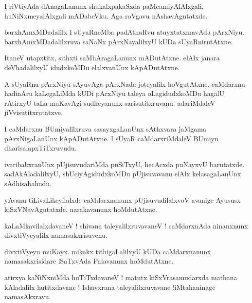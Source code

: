 \documentclass{article}
\begin{document}
\begin{mng}%
I riVtiyAda dAnagaLanunx shukalxpakaSxda paMcamiyAlAlxgali, huNiNxmeyalAlxgali mADabeVku. Aga 
roVgavu nAshavAgutatxde.
\end{mng}

\begin{mng}%
barxhAmxMDadalilx I sUyaRneMba padAthaRvu atuyxtatxmavAda pArxNiyu. barxhAmxMDadalilxruva saNaNx 
pArxNayalilxyU kUDa sUyaRnirutAtxne.
\end{mng}

\begin{mng}%
ItaneV utapxtitx, sithxti saMhAragaLanunx mADutAtxne. elAlx janara deVhadalilxyU idudxkoMDu 
elalxvanUnx kApADutAtxne.
\end{mng}

\begin{mng}%
A sUyaRnu pArxNiyu sAyuvAga pArxNada joteyalilx hoVgutAtxne. caMdarxnu hadinAru kaLegaLiMda kUDi 
pArxNiyu taleya oLagidudxkoMDu hagalU rAtirxyU taLa muKavAgi sudheyanunx sarisutitxruvanu. 
adariMdaleV jiVvisutitxrutatxve.
\end{mng}

\begin{mng}%
I caMdarxnu BUmiyalilxruva sasayxgaLanUnx sAthxvara jaMgama pArxNigaLanUnx kApADutAtxne. I sUyaR 
caMdarxriMdaleV BUmiyu dharisalapxTiTxruvudu.
\end{mng}

\begin{mng}%
ivaribabxranUnx pUjisuvudariMda puSiTxyU, hecAcxda puNayxvU barutatxde. sadAkAladalilxyU, 
shUciyAgidudxkoMDu pUjisuvavanu elAlx kelasagaLanUnx sAdhisabahudu.
\end{mng}

\begin{mng}%
yAvanu tiLivaLikeyilalxde caMdarxnanunx pUjisuvudilalxvoV avanige Ayususx kiSxVNavAgutatxde. 
narakavanunx hoMdutAtxne.
\end{mng}

\begin{mng}%
kaLaMkavilalxdavaneV ! shivana taleyalilxruvavaneV ! caMdarxnAda ninanxnunx divxtiVyeyalilx 
namasakxrisuvenu.
\end{mng}

\begin{mng}%
divxtiVyeyu muKayx. mikakx tithigaLalilxyU kUDa caMdarxnanunx namasakxrisidare iSaTxvAda 
Palavanunx hoMdutAtxne.
\end{mng}

\begin{mng}%
atirxya kaNiNxniMda huTiTxdavaneV ! matutx kiSxVrasamudarxda mathana kAladalilx hutitxdavane ! 
Ishavxrana taleyalilxruvavane !iMtahaninage namasAkxravu.
\end{mng}
\end{document}
